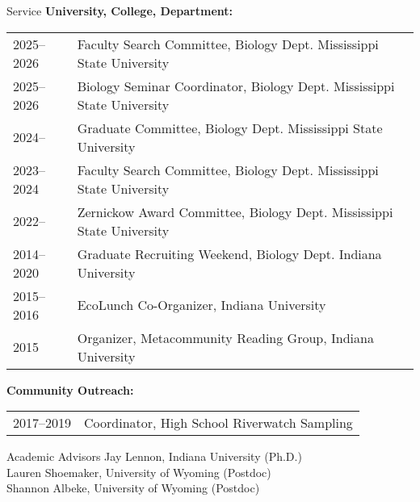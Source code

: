 \documentclass{resume} %
\begin{document}
\begin{rSection}{Service}
{\bf University, College, Department:}
{\def\arraystretch{1}
\begin{xltabular}{0.95\textwidth}{l>{\raggedright\arraybackslash}X}
2025--2026 & Faculty Search Committee, Biology Dept. Mississippi State University\\

2025--2026 & Biology Seminar Coordinator, Biology Dept. Mississippi State University\\

2024-- & Graduate Committee, Biology Dept. Mississippi State University\\

2023--2024 & Faculty Search Committee, Biology Dept. Mississippi State University\\

2022-- & Zernickow Award Committee, Biology Dept. Mississippi State University\\

2014--2020 & Graduate Recruiting Weekend, Biology Dept. Indiana University\\

2015--2016 & EcoLunch Co-Organizer, Indiana University\\

2015 & Organizer, Metacommunity Reading Group, Indiana University\\

\end{xltabular}
}

{\bf Community Outreach:}
{\def\arraystretch{1}
\begin{xltabular}{0.95\textwidth}{l>{\raggedright\arraybackslash}X}
2017--2019 & Coordinator, High School Riverwatch Sampling\\
\end{xltabular}
}


\end{rSection}


\begin{rSection}{Academic Advisors}
Jay Lennon, Indiana University (Ph.D.) \\
Lauren Shoemaker, University of Wyoming (Postdoc) \\
Shannon Albeke, University of Wyoming (Postdoc) 
\end{rSection}
\bigskip

% 
% 
\end{document}
